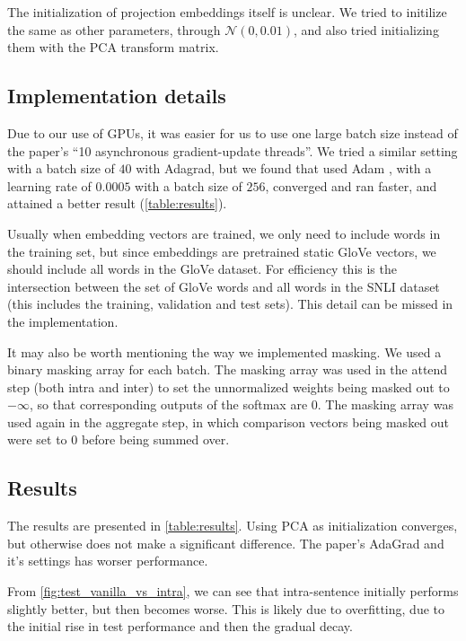 \documentclass{article}
\begin{document}
The initialization of projection embeddings itself is unclear. We tried to initilize the same as other parameters, through $\mathcal{N}(0, 0.01)$, and also tried initializing them with the PCA transform matrix.

\subsection{Implementation details}
Due to our use of GPUs, it was easier for us to use one large batch size instead of the paper's ``10 asynchronous gradient-update threads''. We tried a similar setting with a batch size of $40$ with Adagrad, but we found that used Adam \citep{kingma_adam:_2014}, with a learning rate of $0.0005$ with a batch size of $256$, converged and ran faster, and attained a better result (\autoref{table:results}).

Usually when embedding vectors are trained, we only need to include words in the training set, but since embeddings are pretrained static GloVe vectors, we should include all words in the GloVe dataset. For efficiency this is the intersection between the set of GloVe words and all words in the SNLI dataset (this includes the training, validation and test sets). This detail can be missed in the implementation.

It may also be worth mentioning the way we implemented masking. We used a binary masking array for each batch. The masking array was used in the attend step (both intra and inter) to set the unnormalized weights being masked out to $-\infty$, so that corresponding outputs of the softmax are $0$. The masking array was used again in the aggregate step, in which comparison vectors being masked out were set to $0$ before being summed over.

\subsection{Results}
The results are presented in \autoref{table:results}. Using PCA as initialization converges, but otherwise does not make a significant difference. The paper's AdaGrad and it's settings has worser performance.

From \autoref{fig:test_vanilla_vs_intra}, we can see that intra-sentence initially performs slightly better, but then becomes worse. This is likely due to overfitting, due to the initial rise in test performance and then the gradual decay.
\end{document}
